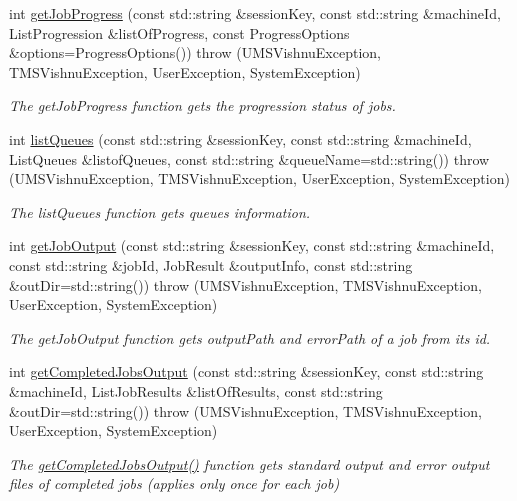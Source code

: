 \begin{DoxyCompactItemize}
int \hyperlink{namespacevishnu_a5bc51ba53a335079d0b7044cc2c8f4cc}{getJobProgress} (const std::string \&sessionKey, const std::string \&machineId, ListProgression \&listOfProgress, const ProgressOptions \&options=ProgressOptions())  throw (UMSVishnuException, TMSVishnuException, UserException, SystemException)
\begin{DoxyCompactList}\small\item\em The getJobProgress function gets the progression status of jobs. \item\end{DoxyCompactList}\item 
int \hyperlink{namespacevishnu_ada2d98155cffa475261261fb33f7e873}{listQueues} (const std::string \&sessionKey, const std::string \&machineId, ListQueues \&listofQueues, const std::string \&queueName=std::string())  throw (UMSVishnuException, TMSVishnuException, UserException, SystemException)
\begin{DoxyCompactList}\small\item\em The listQueues function gets queues information. \item\end{DoxyCompactList}\item 
int \hyperlink{namespacevishnu_a6e0b3df33a91bd16cdadf3ac428fcf0e}{getJobOutput} (const std::string \&sessionKey, const std::string \&machineId, const std::string \&jobId, JobResult \&outputInfo, const std::string \&outDir=std::string())  throw (UMSVishnuException, TMSVishnuException, UserException, SystemException)
\begin{DoxyCompactList}\small\item\em The getJobOutput function gets outputPath and errorPath of a job from its id. \item\end{DoxyCompactList}\item 
int \hyperlink{namespacevishnu_aaedc4b5676f0c8e47f333316cff0b0a8}{getCompletedJobsOutput} (const std::string \&sessionKey, const std::string \&machineId, ListJobResults \&listOfResults, const std::string \&outDir=std::string())  throw (UMSVishnuException, TMSVishnuException, UserException, SystemException)
\begin{DoxyCompactList}\small\item\em The \hyperlink{namespacevishnu_aaedc4b5676f0c8e47f333316cff0b0a8}{getCompletedJobsOutput()} function gets standard output and error output files of completed jobs (applies only once for each job) \item\end{DoxyCompactList}\item 

\end{DoxyCompactItemize}
